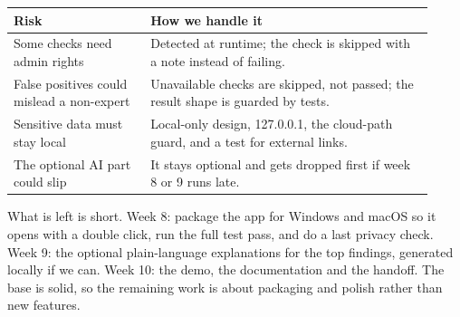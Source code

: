 \documentclass[11pt,a4paper]{article}
\begin{document}
\begin{table}[h]
\centering\small
\begin{tabular}{@{}p{0.30\linewidth}p{0.62\linewidth}@{}}
\toprule
Risk & How we handle it \\
\midrule
Some checks need admin rights & Detected at runtime; the check is skipped with a note instead of failing. \\
False positives could mislead a non-expert & Unavailable checks are skipped, not passed; the result shape is guarded by tests. \\
Sensitive data must stay local & Local-only design, 127.0.0.1, the cloud-path guard, and a test for external links. \\
The optional AI part could slip & It stays optional and gets dropped first if week 8 or 9 runs late. \\
\bottomrule
\end{tabular}
\end{table}

What is left is short. Week 8: package the app for Windows and macOS so it opens with a
double click, run the full test pass, and do a last privacy check. Week 9: the optional
plain-language explanations for the top findings, generated locally if we can. Week 10:
the demo, the documentation and the handoff. The base is solid, so the remaining work
is about packaging and polish rather than new features.
\end{document}
